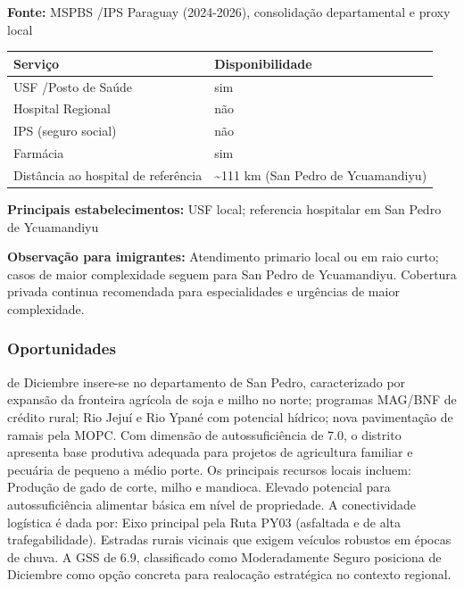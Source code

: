 \textbf{Fonte:} MSPBS /\allowbreak  IPS Paraguay (2024-2026), consolidação
departamental e proxy local

{\def\LTcaptype{none} %
\begin{longtable}[]{@{}
  >{\raggedright\arraybackslash}p{}
  >{\raggedright\arraybackslash}p{}@{}}
\toprule\noalign{}
\begin{minipage}[b]{\linewidth}\raggedright
Serviço
\end{minipage} & \begin{minipage}[b]{\linewidth}\raggedright
Disponibilidade
\end{minipage} \\
\midrule\noalign{}
\endhead
\bottomrule\noalign{}
\endlastfoot
USF /\allowbreak  Posto de Saúde & sim \\
Hospital Regional & não \\
IPS (seguro social) & não \\
Farmácia & sim \\
Distância ao hospital de referência & \textasciitilde111 km (San Pedro
de Ycuamandiyu) \\
\end{longtable}
}

\textbf{Principais estabelecimentos:} USF local; referencia hospitalar
em San Pedro de Ycuamandiyu

\textbf{Observação para imigrantes:} Atendimento primario local ou em
raio curto; casos de maior complexidade seguem para San Pedro de
Ycuamandiyu. Cobertura privada continua recomendada para especialidades
e urgências de maior complexidade.
\newpage

\subsubsection*{Oportunidades}\label{oport-de-diciembre-0212}
de Diciembre insere-se no departamento de San Pedro, caracterizado por expansão da fronteira agrícola de soja e milho no norte; programas MAG/BNF de crédito rural; Rio Jejuí e Rio Ypané com potencial hídrico; nova pavimentação de ramais pela MOPC. Com dimensão de autossuficiência de 7.0, o distrito apresenta base produtiva adequada para projetos de agricultura familiar e pecuária de pequeno a médio porte. Os principais recursos locais incluem: Produção de gado de corte, milho e mandioca. Elevado potencial para autossuficiência alimentar básica em nível de propriedade. A conectividade logística é dada por: Eixo principal pela Ruta PY03 (asfaltada e de alta trafegabilidade). Estradas rurais vicinais que exigem veículos robustos em épocas de chuva. A GSS de 6.9, classificado como Moderadamente Seguro posiciona de Diciembre como opção concreta para realocação estratégica no contexto regional.

